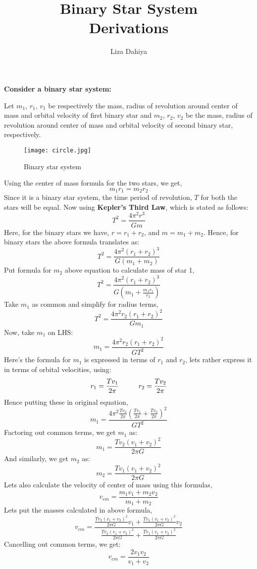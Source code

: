 \documentclass{article}
\title{Binary Star System\\\Large Derivations}
\author{Liza Dahiya}
\date{ }
\begin{document}
\maketitle

\textbf{Consider a binary star system:}\\ \par
Let $m_1$, $r_1$, $v_1$ be respectively the mass, radius of revolution around center of mass and orbital velocity of first binary star and $m_2$, $r_2$, $v_2$ be the mass, radius of revolution around center of mass and orbital velocity of second binary star, respectively. \par
\begin{figure}[h]
    \centering
    \texttt{[image: circle.jpg]}
    \caption{Binary star system}
    \label{fig:mesh1}
\end{figure}
Using the center of mass formula for the two stars, we get,
$$m_1r_1 = m_2r_2$$ 
Since it is a binary star system, the time period of revolution, $T$ for both the stars will be equal. Now using \textbf{Kepler's Third Law}, which is stated as follows:
$$T^2 = \frac{4 \pi^2 r^3}{G m}$$
Here, for the binary stars we have, $r = r_1 + r_2$, and $m = m_1 + m_2$. Hence, for binary stars the above formula translates as: 
$$T^2 = \frac{4 \pi^2 (r_1 + r_2)^3}{G (m_1 + m_2)}$$
Put formula for $m_2$ above equation to calculate mass of star 1,
$$T^2 = \frac{4 \pi^2 (r_1 + r_2)^3}{G (m_1 + \frac{m_1r_1}{r_2})}$$
Take $m_1$ as common and simplify for radius terms,
$$T^2 = \frac{4 \pi^2 r_2 (r_1 + r_2)^2}{G m_1}$$
Now, take $m_1$ on LHS:
$$m_1 = \frac{4 \pi^2 r_2 (r_1 + r_2)^2}{G T^2}$$
Here's the formula for $m_1$ is expressed in terms of $r_1$ and $r_2$, lets rather express it in terms of orbital velocities, using:
$$r_1=\frac{T v_1}{2 \pi} \hspace{1 cm} r_2=\frac{T v_2}{2 \pi}$$
Hence putting these in original equation,
$$m_1 = \frac{4 \pi^2 \frac{T v_2}{2 \pi} (\frac{T v_1}{2 \pi} + \frac{T v_2}{2 \pi})^2}{G T^2}$$
Factoring out common terms, we get $m_1$ as:
{\color{blue} $$m_1 = \frac{T v_2 (v_1 + v_2)^2}{2 \pi G}$$}
And similarly, we get $m_2$ as:
{\color{blue}$$m_2 = \frac{T v_1 (v_1 + v_2)^2}{2 \pi G}$$}
Lets also calculate the velocity of center of mass using this formulas,
$$v_{cm} = \frac{m_1v_1 + m_2v_2}{m_1 + m_2}$$
Lets put the masses calculated in above formula,
$$v_{cm} = \frac{\frac{T v_2 (v_1 + v_2)^2}{2 \pi G}v_1 + \frac{T v_1 (v_1 + v_2)^2}{2 \pi G}v_2}{\frac{T v_2 (v_1 + v_2)^2}{2 \pi G} + \frac{T v_1 (v_1 + v_2)^2}{2 \pi G}}$$
Cancelling out common terms, we get:
{\color{blue}$$v_{cm} = \frac{2 v_1v_2}{v_1 + v_2}$$}
\end{document}
